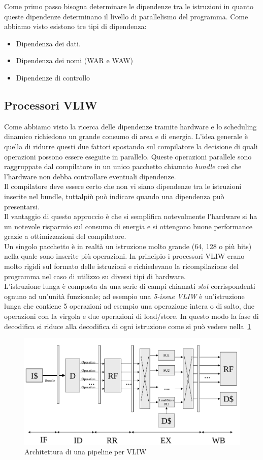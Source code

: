 Come primo passo bisogna determinare le dipendenze tra le istruzioni in quanto queste dipendenze determinano il livello di parallelismo del programma. Come abbiamo visto esistono tre tipi di dipendenza:
\begin{itemize}
\item Dipendenza dei dati.
\item Dipendenza dei nomi (WAR e WAW)
\item Dipendenze di controllo
\end{itemize}
\subsection{Processori VLIW}
Come abbiamo visto la ricerca delle dipendenze tramite hardware e lo scheduling dinamico richiedono un grande consumo di area e di energia. L'idea generale è quella di ridurre questi due fattori spostando sul compilatore la decisione di quali operazioni possono essere eseguite in parallelo. Queste operazioni parallele sono raggruppate dal compilatore in un unico pacchetto chiamato \emph{bundle} così che l'hardware non debba controllare eventuali dipendenze.\\
Il compilatore deve essere certo che non vi siano dipendenze tra le istruzioni inserite nel bundle, tuttalpiù può indicare quando una dipendenza può presentarsi.\\
Il vantaggio di questo approccio è che si semplifica notevolmente l'hardware si ha un notevole risparmio sul consumo di energia e si ottengono buone performance grazie a ottimizzazioni del compilatore.\\
Un singolo pacchetto è in realtà un istruzione molto grande (64, 128 o più bits) nella quale sono inserite più operazioni. In principio i processori VLIW erano molto rigidi sul formato delle istruzioni e richiedevano la ricompilazione del programma nel caso di utilizzo su diversi tipi di hardware.\\
L'istruzione lunga è composta da una serie di campi chiamati \emph{slot} corrispondenti ognuno ad un'unità funzionale; ad esempio una \emph{5-issue VLIW} è un'istruzione lunga che contiene 5 operazioni ad esempio una operazione intera o di salto, due operazioni con la virgola e due operazioni di load/store. In questo modo la fase di decodifica si riduce alla decodifica di ogni istruzione come si può vedere nella \figurename\,\ref{fig:vliwarch}
\begin{figure}
\centering
\includegraphics[scale=0.5]{img/vliwarch.png}
\caption{Architettura di una pipeline per VLIW}\label{fig:vliwarch}
\end{figure}
